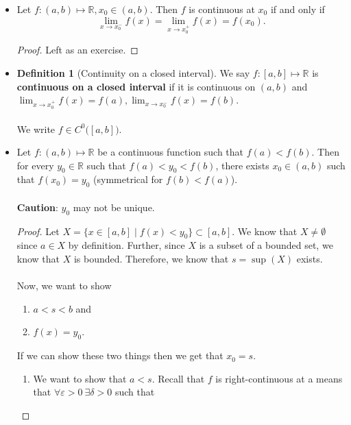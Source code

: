 \documentclass{article}
\newcommand{\R}{\mathbb{R}}
\newcommand{\set}[2]{\{ #1 \mid #2 \}}
\newcommand{\?}{\stackrel{?}{=}}
\theoremstyle{definition} %
\newtheorem{definition}[subsection]{Definition} %
\begin{document}
\begin{itemize}
    \item[]
    \begin{lemma}
        Let $f: (a, b) \mapsto \R, x_0 \in (a, b)$. Then $f$ is continuous at $x_0$ if and only if
        $$\lim_{x \to x_0^-} f(x) = \lim_{x \to x_0^+} f(x) = f(x_0).$$
    \end{lemma}
    \begin{proof}
        Left as an exercise.
    \end{proof}
    \item[]
    \begin{definition}[Continuity on a closed interval]
        We say $f: [a, b] \mapsto \R$ is \textbf{continuous on a closed interval} if it is continuous on $(a, b)$ and $\lim_{x \to x_0^+} f(x) = f(a), \lim_{x \to x_0^-} f(x) = f(b)$. \\\\
        We write $f \in C^0\big([a, b]\big)$.
    \end{definition}
    \item[]
    \begin{theorem}
        Let $f: (a, b) \mapsto \R$ be a continuous function such that $f(a) < f(b)$. Then for every $y_0 \in \R$ such that $f(a) < y_0 < f(b)$, there exists $x_0 \in (a, b)$ such that $f(x_0) = y_0$ (symmetrical for $f(b) < f(a)$). \\\\
        \warning \textbf{Caution}: $y_0$ may not be unique.
    \end{theorem}
    \begin{proof}
        Let $X = \set{x \in [a, b]}{f(x) < y_0} \subset [a, b]$. We know that $X \neq \emptyset$ since $a \in X$ by definition. Further, since $X$ is a subset of a bounded set, we know that $X$ is bounded. Therefore, we know that $s = \sup(X)$ exists. \\\\
        Now, we want to show
        \begin{enumerate}[label=(\roman*)]
            \item $a < s < b$ and
            \item $f(x) = y_0$.
        \end{enumerate}
        If we can show these two things then we get that $x_0 = s$.
        \begin{enumerate}[label=(\roman*)]
            \item We want to show that $a < s$. Recall that $f$ is right-continuous at a means that $\forall \varepsilon > 0 \ \exists \delta > 0$ such that

\end{enumerate}
\end{proof}
\end{itemize}
\end{document}
